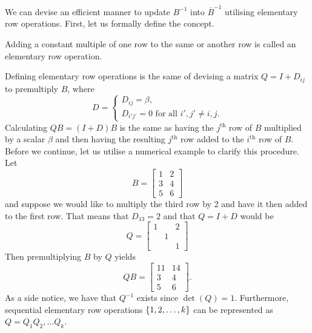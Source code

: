 We can devise an efficient manner to update $B^{-1}$ into $\overline{B}^{-1}$ utilising elementary row operations. First, let us formally define the concept.

\begin{definition}
	Adding a constant multiple of one row to the same or another row is called an elementary row operation.
\end{definition}

Defining elementary row operations is the same of devising a matrix $Q = I + D_{ij}$ to premultiply $B$, where
%
\begin{equation*}
	D = \begin{cases}
		D_{ij} = \beta, \\
	    D_{i'j'} = 0 \text{ for all $i',j' \neq i,j$}.  
	\end{cases}
\end{equation*}
%
Calculating $QB = (I + D)B$ is the same as having the $j^{\text{th}}$ row of $B$ multiplied by a scalar $\beta$ and then having the resulting $j^{\text{th}}$ row added to the $i^{\text{th}}$ row of $B$. Before we continue, let us utilise a numerical example to clarify this procedure.
%
Let
%
\begin{equation*} 
	B = \begin{bmatrix} 1 & 2 \\ 3 & 4 \\ 5 & 6
		\end{bmatrix}
\end{equation*}
%
and suppose we would like to multiply the third row by 2 and have it then added to the first row. That means that $D_{13} = 2$ and that $Q = I + D$ would be
%
\begin{equation*} 
	Q = \begin{bmatrix} 1 & & 2\\ & 1 & \\ & & 1 	\end{bmatrix}
\end{equation*}
%
Then premultiplying $B$ by $Q$ yields
%
\begin{equation*}
	QB = \begin{bmatrix} 11 & 14 \\ 3 & 4 \\ 5 & 6
		 \end{bmatrix}.
\end{equation*}	
%
As a side notice, we have that $Q^{-1}$ exists since $\det(Q) = 1$. Furthermore, sequential elementary row operations $\left\{ 1,2,\dots, k \right \}$ can be represented as $Q = Q_1Q_2,\dots Q_k$.

